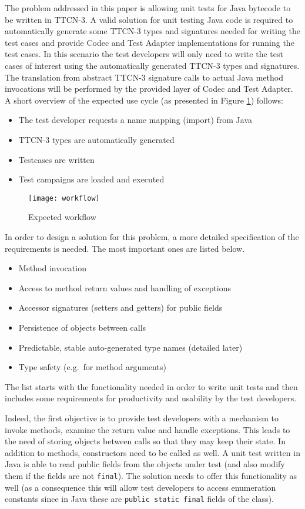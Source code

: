 The problem addressed in this paper is
allowing unit tests for Java bytecode to be written in \ac{TTCN-3}.
A valid solution for unit testing Java code is required to
automatically generate some \ac{TTCN-3} types and signatures
needed for writing the test cases
and provide Codec and Test Adapter implementations for running the test cases.
In this scenario the test developers will only need to write the test cases
of interest using the automatically generated \ac{TTCN-3} types and signatures.
The translation
from abstract \ac{TTCN-3} signature calls to actual Java method invocations
will be performed by the provided layer of Codec and Test Adapter.
A short overview of the expected use cycle
(as presented in Figure \ref{fig:workflow})
follows:
\begin{itemize}
\item The test developer requests a name mapping (import) from Java
\item \ac{TTCN-3} types are automatically generated
\item Testcases are written
\item Test campaigns are loaded and executed
\end{itemize}

\begin{figure}
\centering
\texttt{[image: workflow]}
\caption{Expected workflow\label{fig:workflow}}
\end{figure}

In order to design a solution for this problem,
a more detailed specification of the requirements is needed.
The most important ones are listed below.
\begin{itemize}
\item Method invocation
\item Access to method return values and handling of exceptions
\item Accessor signatures (setters and getters) for public fields
\item Persistence of objects between calls
\item Predictable, stable auto-generated type names (detailed later)
\item Type safety (e.g.\ for method arguments)
\end{itemize}

The list starts with the functionality needed in order to write unit tests
and then includes some requirements
for productivity and usability by the test developers.

Indeed, the first objective is to provide test developers
with a mechanism to invoke methods,
examine the return value and handle exceptions.
This leads to the need of storing objects between calls
so that they may keep their state.
In addition to methods, constructors need to be called as well.
A unit test written in Java is able to read public fields
from the objects under test
(and also modify them if the fields are not \verb=final=).
The solution needs to offer this functionality as well
(as a consequence this will allow test developers
to access enumeration constants
since in Java these are {\tt public static final} fields of the class).

